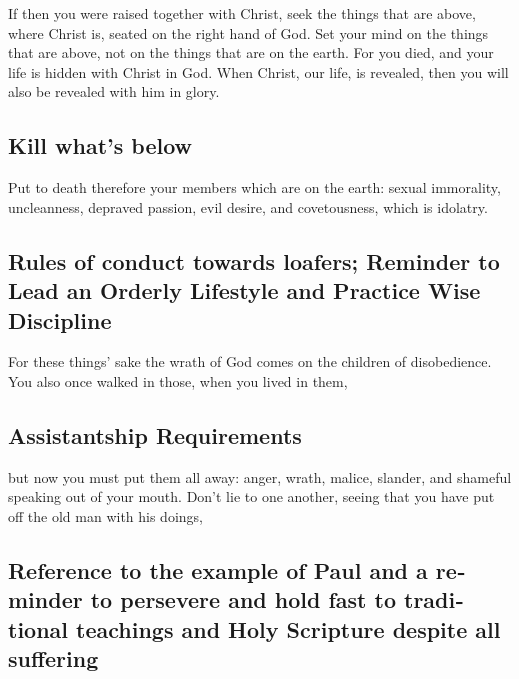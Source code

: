 \begin{paracol}{2}
\begin{otherlanguage}{english}
 If then you were raised together with Christ, seek the
things that are above, where Christ is, seated on the right hand of God.
 Set your mind on the things that are above, not on the
things that are on the earth.  For you died, and your life
is hidden with Christ in God.  When Christ, our life, is
revealed, then you will also be revealed with him in glory.

\hypertarget{kill-whats-below}{%
\subsection{Kill what's below}\label{kill-whats-below}}

 Put to death therefore your members which are on the
earth: sexual immorality, uncleanness, depraved passion, evil desire,
and covetousness, which is idolatry.

\hypertarget{rules-of-conduct-towards-loafers-reminder-to-lead-an-orderly-lifestyle-and-practice-wise-discipline}{%
\subsection{Rules of conduct towards loafers; Reminder to Lead an
Orderly Lifestyle and Practice Wise
Discipline}\label{rules-of-conduct-towards-loafers-reminder-to-lead-an-orderly-lifestyle-and-practice-wise-discipline}}

 For these things' sake the wrath of God comes on the
children of disobedience.  You also once walked in those,
when you lived in them,

\hypertarget{assistantship-requirements}{%
\subsection{Assistantship
Requirements}\label{assistantship-requirements}}

 but now you must put them all away: anger, wrath, malice,
slander, and shameful speaking out of your mouth.  Don't
lie to one another, seeing that you have put off the old man with his
doings,

\hypertarget{reference-to-the-example-of-paul-and-a-reminder-to-persevere-and-hold-fast-to-traditional-teachings-and-holy-scripture-despite-all-suffering}{%
\subsection{Reference to the example of Paul and a reminder to persevere
and hold fast to traditional teachings and Holy Scripture despite all
suffering}\label{reference-to-the-example-of-paul-and-a-reminder-to-persevere-and-hold-fast-to-traditional-teachings-and-holy-scripture-despite-all-suffering}}


\end{otherlanguage}
\end{paracol}

